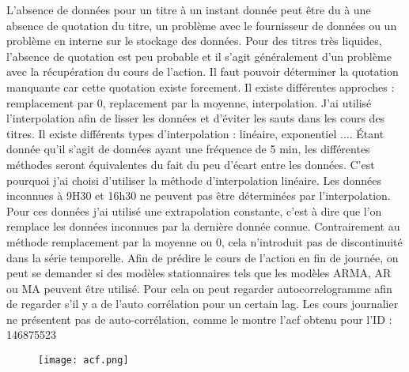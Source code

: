 \documentclass[12pt]{scrartcl} %
\begin{document}
L'absence de données pour un titre à un instant donnée peut être du à une absence de quotation du titre, un problème avec le fournisseur de données ou un problème en interne sur le stockage des données. Pour des titres très liquides, l'absence de quotation est peu probable et il s'agit généralement d'un problème avec la récupération du cours de l'action. Il faut pouvoir déterminer la quotation manquante car cette quotation existe forcement. Il existe différentes approches : remplacement par 0, replacement par la moyenne, interpolation. J'ai utilisé l'interpolation afin de lisser les données et d'éviter les sauts dans les cours des titres. Il existe différents types d'interpolation : linéaire, exponentiel .... Étant donnée qu'il s'agit de données ayant une fréquence de 5 min, les différentes méthodes seront équivalentes du fait du peu d'écart entre les données. C'est pourquoi j'ai choisi d'utiliser la méthode d'interpolation linéaire. Les données inconnues à 9H30 et 16h30 ne peuvent pas être déterminées par l'interpolation. Pour ces données j'ai utilisé une extrapolation constante, c'est à dire que l'on remplace les données inconnues par la dernière donnée connue. Contrairement au méthode remplacement par la moyenne ou 0, cela n'introduit pas de discontinuité dans la série temporelle.
\newline
Afin de prédire le cours de l'action en fin de journée, on peut se demander si des modèles stationnaires tels que les modèles ARMA, AR ou MA peuvent être utilisé. Pour cela on peut regarder autocorrelogramme afin de regarder s'il y a de l'auto corrélation pour un certain lag. Les cours journalier ne présentent pas de auto-corrélation, comme le montre l'acf obtenu pour l'ID : 146875523
\begin{figure}[!h]
\centering
\texttt{[image: acf.png]}
\end{figure}
\end{document}
